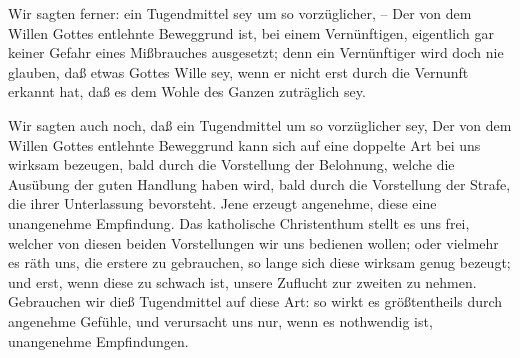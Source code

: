 \begin{aufzb}
\item Wir sagten ferner: ein Tugendmittel sey um so vorzüglicher,  -- Der von dem Willen Gottes entlehnte Beweggrund ist, bei einem Vernünftigen, eigentlich gar keiner Gefahr eines Mißbrauches ausgesetzt; denn ein Vernünftiger wird doch nie glauben, daß etwas Gottes Wille sey, wenn er nicht erst durch die Vernunft erkannt hat, daß es dem Wohle des Ganzen zuträglich sey.
\item Wir sagten auch noch, daß ein Tugendmittel um so vorzüglicher sey,  Der von dem Willen Gottes entlehnte Beweggrund kann sich auf eine doppelte Art bei uns wirksam bezeugen, bald durch die Vorstellung der Belohnung, welche die Ausübung der guten Handlung haben wird, bald durch die Vorstellung der Strafe, die ihrer Unterlassung bevorsteht. Jene erzeugt angenehme, diese eine unangenehme Empfindung. Das katholische Christenthum stellt es uns frei, welcher von diesen beiden Vorstellungen wir uns bedienen wollen; oder vielmehr es räth uns, die erstere zu gebrauchen, so lange sich diese wirksam genug bezeugt; und erst, wenn diese zu schwach ist, unsere Zuflucht zur zweiten zu nehmen. Gebrauchen wir dieß Tugendmittel auf diese Art: so wirkt es größtentheils durch angenehme Gefühle, und verursacht uns nur, wenn es nothwendig ist, unangenehme Empfindungen.
\end{aufzb}

